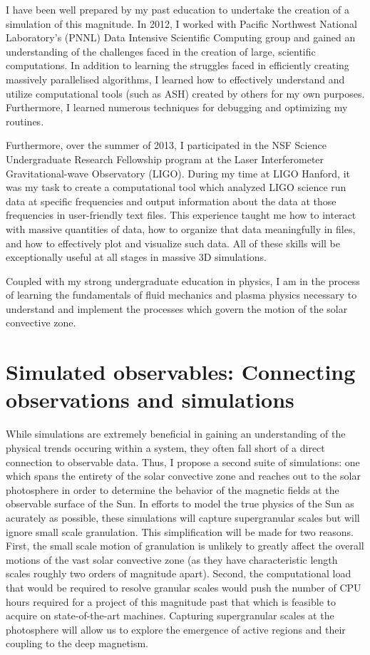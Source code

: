 \documentclass[aasms,12pt]{article}
\begin{document}
I have been well prepared by my past education to undertake the creation of
a simulation of this magnitude.  
In 2012, I worked with
Pacific Northwest National Laboratory's (PNNL) Data Intensive Scientific
Computing group and gained an understanding of the challenges faced in the
creation of large, scientific computations.  In addition to learning the
struggles faced in efficiently creating massively parallelised algorithms,
I learned how to effectively understand and utilize computational tools
(such as ASH) created by others for my own purposes. Furthermore, I learned
numerous techniques for debugging and optimizing my routines.

Furthermore, over the summer of 2013, I participated in the NSF Science
Undergraduate Research Fellowship program at the Laser Interferometer
Gravitational-wave Observatory (LIGO).  During my time at LIGO Hanford, it was
my task to create a computational tool which analyzed LIGO science run data at
specific frequencies and output information about the data at those frequencies
in user-friendly text files.  This experience taught me how to interact with
massive quantities of data, how to organize that data meaningfully in files,
and how to effectively plot and visualize such data.  All of these skills
will be exceptionally useful at all stages in massive 3D simulations.

Coupled with my strong undergraduate education in physics, I am in the process
of learning the fundamentals of fluid mechanics and plasma physics necessary to
understand and implement the processes which govern the motion of the solar 
convective zone.

\section{Simulated observables: Connecting observations and simulations}
While simulations are extremely beneficial in gaining an understanding of the
physical trends occuring within a system, they often fall short of a direct
connection to observable data.  Thus, I propose a second suite of simulations:
one which spans the entirety of the solar convective zone and reaches out to
the solar photosphere in order to determine the behavior of the magnetic fields
at the observable surface of the Sun.  In efforts to model the true physics of
the Sun as acurately as possible, these simulations will capture supergranular 
scales but will ignore small scale granulation.  This simplification will be
made for two reasons.  First, the small scale motion of granulation is unlikely
to greatly affect the overall motions of the vast solar convective zone (as
they have characteristic length scales roughly two orders of magnitude apart).
Second, the computational load that would be required to resolve granular scales
would push the number of CPU hours required for a project of this magnitude
past that which is feasible to acquire on state-of-the-art machines.
Capturing supergranular scales at the photosphere will allow us to explore the
emergence of active regions and their coupling to the deep magnetism.
\end{document}
